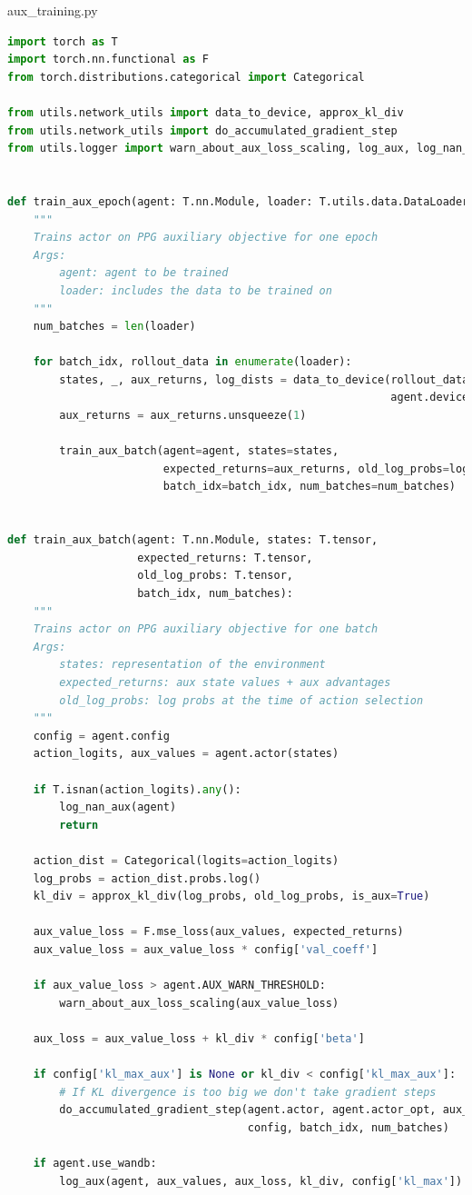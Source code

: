 \documentclass{article}
\begin{document}
\newpage
aux\_training.py
\begin{lstlisting}[language=Python]
import torch as T
import torch.nn.functional as F
from torch.distributions.categorical import Categorical

from utils.network_utils import data_to_device, approx_kl_div
from utils.network_utils import do_accumulated_gradient_step
from utils.logger import warn_about_aux_loss_scaling, log_aux, log_nan_aux


def train_aux_epoch(agent: T.nn.Module, loader: T.utils.data.DataLoader):
    """
    Trains actor on PPG auxiliary objective for one epoch
    Args:
        agent: agent to be trained
        loader: includes the data to be trained on
    """
    num_batches = len(loader)

    for batch_idx, rollout_data in enumerate(loader):
        states, _, aux_returns, log_dists = data_to_device(rollout_data,
                                                           agent.device)
        aux_returns = aux_returns.unsqueeze(1)

        train_aux_batch(agent=agent, states=states,
                        expected_returns=aux_returns, old_log_probs=log_dists,
                        batch_idx=batch_idx, num_batches=num_batches)


def train_aux_batch(agent: T.nn.Module, states: T.tensor,
                    expected_returns: T.tensor,
                    old_log_probs: T.tensor,
                    batch_idx, num_batches):
    """
    Trains actor on PPG auxiliary objective for one batch
    Args:
        states: representation of the environment
        expected_returns: aux state values + aux advantages
        old_log_probs: log probs at the time of action selection
    """
    config = agent.config
    action_logits, aux_values = agent.actor(states)

    if T.isnan(action_logits).any():
        log_nan_aux(agent)
        return

    action_dist = Categorical(logits=action_logits)
    log_probs = action_dist.probs.log()
    kl_div = approx_kl_div(log_probs, old_log_probs, is_aux=True)

    aux_value_loss = F.mse_loss(aux_values, expected_returns)
    aux_value_loss = aux_value_loss * config['val_coeff']

    if aux_value_loss > agent.AUX_WARN_THRESHOLD:
        warn_about_aux_loss_scaling(aux_value_loss)

    aux_loss = aux_value_loss + kl_div * config['beta']

    if config['kl_max_aux'] is None or kl_div < config['kl_max_aux']:
        # If KL divergence is too big we don't take gradient steps
        do_accumulated_gradient_step(agent.actor, agent.actor_opt, aux_loss,
                                     config, batch_idx, num_batches)

    if agent.use_wandb:
        log_aux(agent, aux_values, aux_loss, kl_div, config['kl_max'])
\end{lstlisting}
\end{document}
